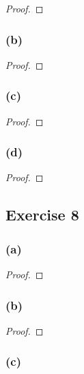 \documentclass[14pt]{extarticle}
\begin{document}
\begin{proof}

\end{proof}

\subsubsection{(b)}

\begin{proof}

\end{proof}

\subsubsection{(c)}

\begin{proof}

\end{proof}

\subsubsection{(d)}

\begin{proof}

\end{proof}

\subsection{Exercise 8}

\subsubsection{(a)}

\begin{proof}

\end{proof}

\subsubsection{(b)}

\begin{proof}

\end{proof}

\subsubsection{(c)}
\end{document}
